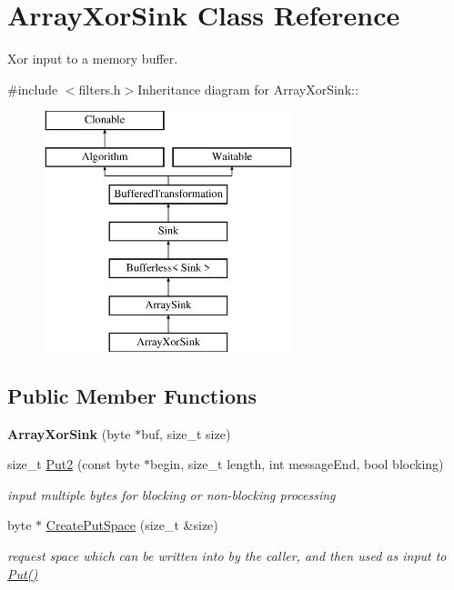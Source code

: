 \hypertarget{class_array_xor_sink}{
\section{ArrayXorSink Class Reference}
\label{class_array_xor_sink}
}


Xor input to a memory buffer.  


{\ttfamily \#include $<$filters.h$>$}Inheritance diagram for ArrayXorSink::\begin{figure}[H]
\begin{center}
\leavevmode
\includegraphics[height=7cm]{class_array_xor_sink}
\end{center}
\end{figure}
\subsection*{Public Member Functions}
\begin{DoxyCompactItemize}
\item 
\hypertarget{class_array_xor_sink_a2cb0d33318f1272826d235698191b68d}{
{\bfseries ArrayXorSink} (byte $\ast$buf, size\_\-t size)}
\label{class_array_xor_sink_a2cb0d33318f1272826d235698191b68d}

\item 
size\_\-t \hyperlink{class_array_xor_sink_adc9d43ea392d62c8e87f29702085da3e}{Put2} (const byte $\ast$begin, size\_\-t length, int messageEnd, bool blocking)
\begin{DoxyCompactList}\small\item\em input multiple bytes for blocking or non-\/blocking processing \item\end{DoxyCompactList}\item 
byte $\ast$ \hyperlink{class_array_xor_sink_a39567ce27137cc06ed9a2b0a1c834f01}{CreatePutSpace} (size\_\-t \&size)
\begin{DoxyCompactList}\small\item\em request space which can be written into by the caller, and then used as input to \hyperlink{class_buffered_transformation_ae70658b0d271f8e114ac6c3cc9774ede}{Put()} \item\end{DoxyCompactList}\end{DoxyCompactItemize}


